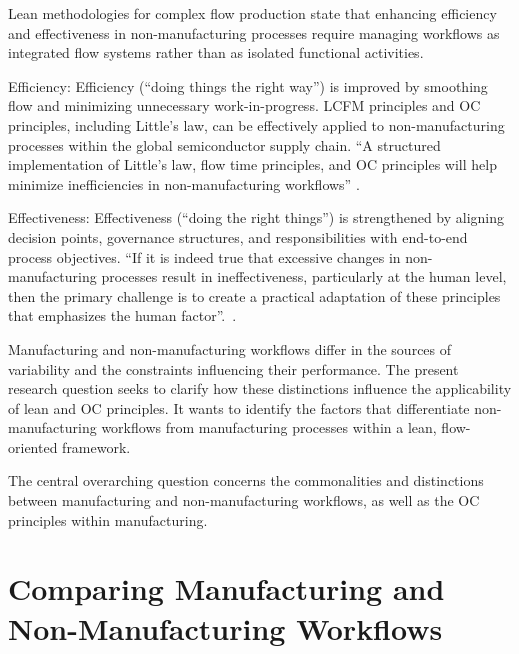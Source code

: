 \documentclass[preprint,12pt,authoryear]{elsarticle}
\begin{document}
\vspace{0.4em} 

Lean methodologies for complex flow production state that enhancing efficiency and effectiveness in non-manufacturing processes require managing workflows as integrated flow systems rather than as isolated functional activities. 

Efficiency: Efficiency (``doing things the right way'') is improved by smoothing flow and minimizing unnecessary work-in-progress. LCFM principles and OC principles, including Little's law, can be effectively applied to non-manufacturing processes within the global semiconductor supply chain. ``A structured implementation of Little's law, flow time principles, and OC principles will help minimize inefficiencies in non-manufacturing workflows'' \citep{LauterEhmReiner2025}.

Effectiveness: Effectiveness (``doing the right things'') is strengthened by aligning decision points, governance structures, and responsibilities with end-to-end process objectives. ``If it is indeed true that excessive changes in non-manufacturing processes result in ineffectiveness, particularly at the human level, then the primary challenge is to create a practical adaptation of these principles that emphasizes the human factor''.\ \citep{LauterEhmReiner2025}.

\vspace{0.4em} 

Manufacturing and non-manufacturing workflows differ in the sources of variability and the constraints influencing their performance. The present research question seeks to clarify how these distinctions influence the applicability of lean and OC principles. It wants to identify the factors that differentiate non-manufacturing workflows from manufacturing processes within a lean, flow-oriented framework.

The central overarching question concerns the commonalities and distinctions between manufacturing and non-manufacturing workflows, as well as the OC principles within manufacturing.


\section{Comparing Manufacturing and Non-Manufacturing Workflows}\label{sec:Comparing Manufacturing and Non-Manufacturing Workflows}
    
\end{document}
